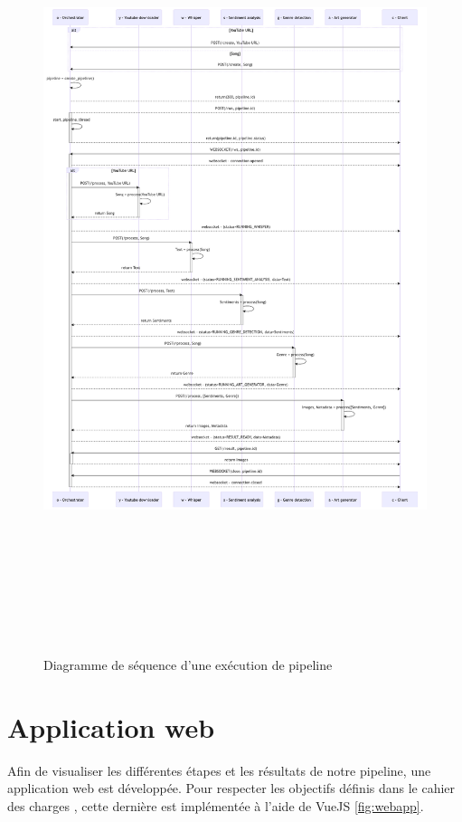 \begin{figure}[H]
    \begin{center}
        \includegraphics[height=23cm,]{rsc/sequence_diagram.png}
        \caption{Diagramme de séquence d'une exécution de pipeline}
        \label{fig:seq_diagram}
    \end{center}
\end{figure}

\section{Application web}
Afin de visualiser les différentes étapes et les résultats de notre pipeline, une application web est développée. Pour respecter les objectifs définis dans le cahier des charges \cite{CDC}, cette dernière est implémentée à l'aide de VueJS \ref{fig:webapp}.

